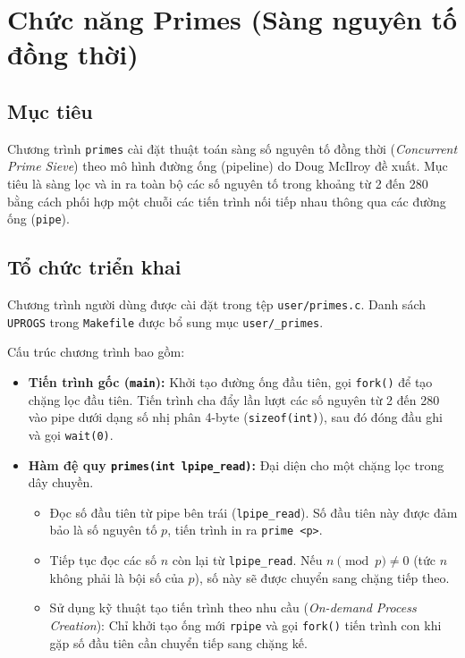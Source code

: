 \section{Chức năng Primes (Sàng nguyên tố đồng thời)}

\subsection{Mục tiêu}
Chương trình \texttt{primes} cài đặt thuật toán sàng số nguyên tố đồng thời (\textit{Concurrent Prime Sieve}) theo mô hình đường ống (pipeline) do Doug McIlroy đề xuất. Mục tiêu là sàng lọc và in ra toàn bộ các số nguyên tố trong khoảng từ 2 đến 280 bằng cách phối hợp một chuỗi các tiến trình nối tiếp nhau thông qua các đường ống (\texttt{pipe}).

\subsection{Tổ chức triển khai}
Chương trình người dùng được cài đặt trong tệp \texttt{user/primes.c}. Danh sách \texttt{UPROGS} trong \texttt{Makefile} được bổ sung mục \texttt{user/\_primes}.

Cấu trúc chương trình bao gồm:
\begin{itemize}
  \item \textbf{Tiến trình gốc (\texttt{main}):} Khởi tạo đường ống đầu tiên, gọi \texttt{fork()} để tạo chặng lọc đầu tiên. Tiến trình cha đẩy lần lượt các số nguyên từ 2 đến 280 vào pipe dưới dạng số nhị phân 4-byte (\texttt{sizeof(int)}), sau đó đóng đầu ghi và gọi \texttt{wait(0)}.
  \item \textbf{Hàm đệ quy \texttt{primes(int lpipe\_read)}:} Đại diện cho một chặng lọc trong dây chuyền.
    \begin{itemize}
      \item Đọc số đầu tiên từ pipe bên trái (\texttt{lpipe\_read}). Số đầu tiên này được đảm bảo là số nguyên tố $p$, tiến trình in ra \texttt{prime <p>}.
      \item Tiếp tục đọc các số $n$ còn lại từ \texttt{lpipe\_read}. Nếu $n \pmod p \neq 0$ (tức $n$ không phải là bội số của $p$), số này sẽ được chuyển sang chặng tiếp theo.
      \item Sử dụng kỹ thuật tạo tiến trình theo nhu cầu (\textit{On-demand Process Creation}): Chỉ khởi tạo ống mới \texttt{rpipe} và gọi \texttt{fork()} tiến trình con khi gặp số đầu tiên cần chuyển tiếp sang chặng kế.
    \end{itemize}
\end{itemize}

